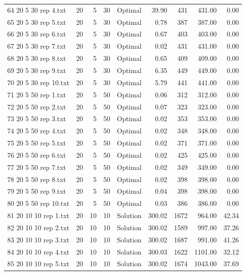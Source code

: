 \begin{longtable}{lrrllrrrr}
64 20 5 30 rep 4.txt & 20 & 5 & 30 & Optimal & 39.90 & 431 & 431.00 &  0.00\\
65 20 5 30 rep 5.txt & 20 & 5 & 30 & Optimal &  0.78 & 387 & 387.00 &  0.00\\
66 20 5 30 rep 6.txt & 20 & 5 & 30 & Optimal &  0.67 & 403 & 403.00 &  0.00\\
67 20 5 30 rep 7.txt & 20 & 5 & 30 & Optimal &  0.02 & 431 & 431.00 &  0.00\\
68 20 5 30 rep 8.txt & 20 & 5 & 30 & Optimal &  0.65 & 409 & 409.00 &  0.00\\
69 20 5 30 rep 9.txt & 20 & 5 & 30 & Optimal &  6.35 & 449 & 449.00 &  0.00\\
70 20 5 30 rep 10.txt & 20 & 5 & 30 & Optimal &  5.79 & 441 & 441.00 &  0.00\\
71 20 5 50 rep 1.txt & 20 & 5 & 50 & Optimal &  0.06 & 312 & 312.00 &  0.00\\
72 20 5 50 rep 2.txt & 20 & 5 & 50 & Optimal &  0.07 & 323 & 323.00 &  0.00\\
73 20 5 50 rep 3.txt & 20 & 5 & 50 & Optimal &  0.02 & 353 & 353.00 &  0.00\\
74 20 5 50 rep 4.txt & 20 & 5 & 50 & Optimal &  0.02 & 348 & 348.00 &  0.00\\
75 20 5 50 rep 5.txt & 20 & 5 & 50 & Optimal &  0.02 & 371 & 371.00 &  0.00\\
76 20 5 50 rep 6.txt & 20 & 5 & 50 & Optimal &  0.02 & 425 & 425.00 &  0.00\\
77 20 5 50 rep 7.txt & 20 & 5 & 50 & Optimal &  0.02 & 349 & 349.00 &  0.00\\
78 20 5 50 rep 8.txt & 20 & 5 & 50 & Optimal &  0.02 & 398 & 398.00 &  0.00\\
79 20 5 50 rep 9.txt & 20 & 5 & 50 & Optimal &  0.04 & 398 & 398.00 &  0.00\\
80 20 5 50 rep 10.txt & 20 & 5 & 50 & Optimal &  0.03 & 386 & 386.00 &  0.00\\
81 20 10 10 rep 1.txt & 20 & 10 & 10 & Solution & 300.02 & 1672 & 964.00 & 42.34\\
82 20 10 10 rep 2.txt & 20 & 10 & 10 & Solution & 300.02 & 1589 & 997.00 & 37.26\\
83 20 10 10 rep 3.txt & 20 & 10 & 10 & Solution & 300.02 & 1687 & 991.00 & 41.26\\
84 20 10 10 rep 4.txt & 20 & 10 & 10 & Solution & 300.03 & 1622 & 1101.00 & 32.12\\
85 20 10 10 rep 5.txt & 20 & 10 & 10 & Solution & 300.02 & 1674 & 1043.00 & 37.69\\

\end{longtable}
